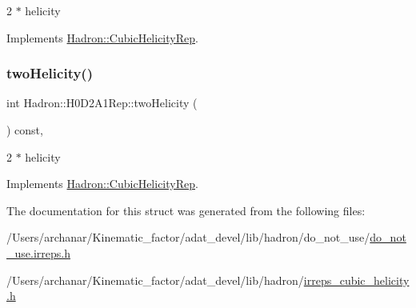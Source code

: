 2 $\ast$ helicity 

Implements \mbox{\hyperlink{structHadron_1_1CubicHelicityRep_af507aa56fc2747eacc8cb6c96db31ecc}{Hadron\+::\+Cubic\+Helicity\+Rep}}.

\mbox{\label{structHadron_1_1H0D2A1Rep_a222dee2dd348d1c79d09ae173d2c2b6f}} 
\subsubsection{\texorpdfstring{twoHelicity()}{twoHelicity()}\hspace{0.1cm}{\footnotesize\ttfamily [2/2]}}
{\footnotesize\ttfamily int Hadron\+::\+H0\+D2\+A1\+Rep\+::two\+Helicity (\begin{DoxyParamCaption}{ }\end{DoxyParamCaption}) const\hspace{0.3cm}{\ttfamily [inline]}, {\ttfamily [virtual]}}

2 $\ast$ helicity 

Implements \mbox{\hyperlink{structHadron_1_1CubicHelicityRep_af507aa56fc2747eacc8cb6c96db31ecc}{Hadron\+::\+Cubic\+Helicity\+Rep}}.



The documentation for this struct was generated from the following files\+:\begin{DoxyCompactItemize}
\item 
/\+Users/archanar/\+Kinematic\+\_\+factor/adat\+\_\+devel/lib/hadron/do\+\_\+not\+\_\+use/\mbox{\hyperlink{do__not__use_8irreps_8h}{do\+\_\+not\+\_\+use.\+irreps.\+h}}\item 
/\+Users/archanar/\+Kinematic\+\_\+factor/adat\+\_\+devel/lib/hadron/\mbox{\hyperlink{lib_2hadron_2irreps__cubic__helicity_8h}{irreps\+\_\+cubic\+\_\+helicity.\+h}}\end{DoxyCompactItemize}
